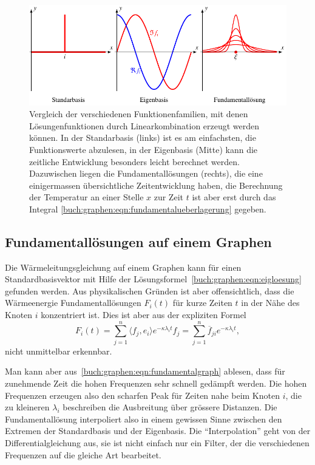 \begin{figure}
\centering
\includegraphics{chapters/70-graphen/images/fundamental.pdf}
\caption{Vergleich der verschiedenen Funktionenfamilien, mit denen
Lösungenfunktionen durch Linearkombination erzeugt werden können.
In der Standarbasis (links) ist es am einfachsten, die Funktionswerte
abzulesen, in der Eigenbasis (Mitte) kann die zeitliche Entwicklung
besonders leicht berechnet werden.
Dazuwischen liegen die Fundamentallösungen (rechts), die eine einigermassen
übersichtliche Zeitentwicklung haben, die Berechnung der Temperatur an 
einer Stelle $x$ zur Zeit $t$ ist aber erst durch das Integral
\eqref{buch:graphen:eqn:fundamentalueberlagerung} gegeben.
\label{buch:graphen:fig:fundamental}}
\end{figure}

\subsection{Fundamentallösungen auf einem Graphen}
Die Wärmeleitungsgleichung auf einem Graphen kann für einen
Standardbasisvektor mit Hilfe der
Lösungsformel~\eqref{buch:graphen:eqn:eigloesung}
gefunden werden.
Aus physikalischen Gründen ist aber offensichtlich, dass die
Wärmeenergie Fundamentallösungen $F_i(t)$ für kurze Zeiten $t$
in der Nähe des Knoten $i$ konzentriert ist.
Dies ist aber aus der expliziten Formel
\begin{equation}
F_i(t)
=
\sum_{j=1}^n \langle f_j,e_i\rangle e^{-\kappa \lambda_i t} f_j
=
\sum_{j=1}^n \overline{f}_{ji} e^{-\kappa \lambda_i t},
\label{buch:graphen:eqn:fundamentalgraph}
\end{equation}
nicht unmittelbar erkennbar.

Man kann aber aus~\eqref{buch:graphen:eqn:fundamentalgraph} ablesen,
dass für zunehmende Zeit die hohen Frequenzen sehr schnell gedämpft
werden.
Die hohen Frequenzen erzeugen also den scharfen Peak für Zeiten nahe
beim Knoten $i$, die zu kleineren $\lambda_i$ beschreiben die Ausbreitung
über grössere Distanzen.
Die Fundamentallösung interpoliert also in einem gewissen Sinne zwischen
den Extremen der Standardbasis und der Eigenbasis.
Die ``Interpolation'' geht von der Differentialgleichung aus,
sie ist nicht einfach nur ein Filter, der die verschiedenen Frequenzen
auf die gleiche Art bearbeitet.

